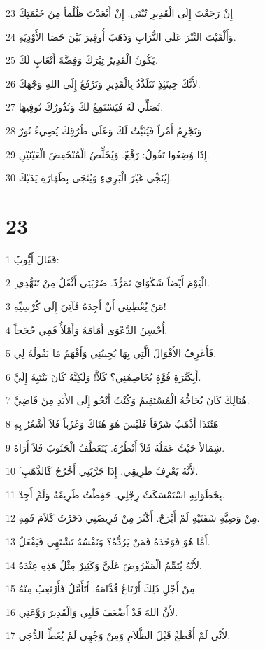 \par 23 إِنْ رَجَعْتَ إِلَى الْقَدِيرِ تُبْنَى. إِنْ أَبْعَدْتَ ظُلْماً مِنْ خَيْمَتِكَ
\par 24 وَأَلْقَيْتَ التِّبْرَ عَلَى التُّرَابِ وَذَهَبَ أُوفِيرَ بَيْنَ حَصَا الأَوْدِيَةِ.
\par 25 يَكُونُ الْقَدِيرُ تِبْرَكَ وَفِضَّةَ أَتْعَابٍ لَكَ.
\par 26 لأَنَّكَ حِينَئِذٍ تَتَلَذَّذُ بِالْقَدِيرِ وَتَرْفَعُ إِلَى اللهِ وَجْهَكَ.
\par 27 تُصَلِّي لَهُ فَيَسْتَمِعُ لَكَ وَنُذُورُكَ تُوفِيهَا.
\par 28 وَتَجْزِمُ أَمْراً فَيُثَبَّتُ لَكَ وَعَلَى طُرُقِكَ يُضِيءُ نُورٌ.
\par 29 إِذَا وُضِعُوا تَقُولُ: رَفْعٌ. وَيُخَلِّصُ الْمُنْخَفِضَ الْعَيْنَيْنِ.
\par 30 يُنَجِّي غَيْرَ الْبَرِيءِ وَيُنْجَى بِطَهَارَةِ يَدَيْكَ].

\chapter{23}

\par 1 فَقَالَ أَيُّوبُ:
\par 2 [الْيَوْمَ أَيْضاً شَكْوَايَ تَمَرُّدٌ. ضَرْبَتِي أَثْقَلُ مِنْ تَنَهُّدِي.
\par 3 مَنْ يُعْطِينِي أَنْ أَجِدَهُ فَآتِيَ إِلَى كُرْسِيِّهِ!
\par 4 أُحْسِنُ الدَّعْوَى أَمَامَهُ وَأَمْلَأُ فَمِي حُجَجاً.
\par 5 فَأَعْرِفُ الأَقْوَالَ الَّتِي بِهَا يُجِيبُنِي وَأَفْهَمُ مَا يَقُولُهُ لِي.
\par 6 أَبِكَثْرَةِ قُوَّةٍ يُخَاصِمُنِي؟ كَلاَّ! وَلَكِنَّهُ كَانَ يَنْتَبِهُ إِلَيَّ.
\par 7 هُنَالِكَ كَانَ يُحَاجُّهُ الْمُسْتَقِيمُ وَكُنْتُ أَنْجُو إِلَى الأَبَدِ مِنْ قَاضِيَّ.
\par 8 هَئَنَذَا أَذْهَبُ شَرْقاً فَلَيْسَ هُوَ هُنَاكَ وَغَرْباً فَلاَ أَشْعُرُ بِهِ
\par 9 شِمَالاً حَيْثُ عَمَلُهُ فَلاَ أَنْظُرُهُ. يَتَعَطَّفُ الْجَنُوبَ فَلاَ أَرَاهُ.
\par 10 [لأَنَّهُ يَعْرِفُ طَرِيقِي. إِذَا جَرَّبَنِي أَخْرُجُ كَالذَّهَبِ.
\par 11 بِخَطَوَاتِهِ اسْتَمْسَكَتْ رِجْلِي. حَفِظْتُ طَرِيقَهُ وَلَمْ أَحِدْ.
\par 12 مِنْ وَصِيَّةِ شَفَتَيْهِ لَمْ أَبْرَحْ. أَكْثَرَ مِنْ فَرِيضَتِي ذَخَرْتُ كَلاَمَ فَمِهِ.
\par 13 أَمَّا هُوَ فَوَحْدَهُ فَمَنْ يَرُدُّهُ؟ وَنَفْسُهُ تَشْتَهِي فَيَفْعَلُ.
\par 14 لأَنَّهُ يُتَمِّمُ الْمَفْرُوضَ عَلَيَّ وَكَثِيرٌ مِثْلُ هَذِهِ عِنْدَهُ.
\par 15 مِنْ أَجْلِ ذَلِكَ أَرْتَاعُ قُدَّامَهُ. أَتَأَمَّلُ فَأَرْتَعِبُ مِنْهُ.
\par 16 لأَنَّ اللهَ قَدْ أَضْعَفَ قَلْبِي وَالْقَدِيرَ رَوَّعَنِي.
\par 17 لأَنِّي لَمْ أُقْطَعْ قَبْلَ الظَّلاَمِ وَمِنْ وَجْهِي لَمْ يُغَطِّ الدُّجَى.

